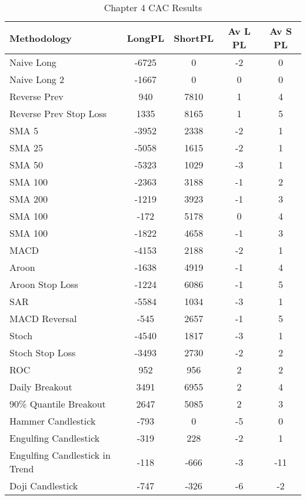 \begin{table}[ht]
\centering
\caption[Chapter 4 CAC Results]{Chapter 4 CAC Results} 
\label{tab:chp6:cac_summary}
\begin{tabular}{lcccc}
  \toprule Methodology & LongPL & ShortPL & Av L PL & Av S PL \\ 
  \midrule Naive Long & -6725 & 0 & -2 & 0 \\ 
  Naive Long 2 & -1667 & 0 & 0 & 0 \\ 
  Reverse Prev & 940 & 7810 & 1 & 4 \\ 
  Reverse Prev Stop Loss & 1335 & 8165 & 1 & 5 \\ 
  SMA 5 & -3952 & 2338 & -2 & 1 \\ 
  SMA 25 & -5058 & 1615 & -2 & 1 \\ 
  SMA 50 & -5323 & 1029 & -3 & 1 \\ 
  SMA 100 & -2363 & 3188 & -1 & 2 \\ 
  SMA 200 & -1219 & 3923 & -1 & 3 \\ 
  SMA 100 & -172 & 5178 & 0 & 4 \\ 
  SMA 100 & -1822 & 4658 & -1 & 3 \\ 
  MACD & -4153 & 2188 & -2 & 1 \\ 
  Aroon & -1638 & 4919 & -1 & 4 \\ 
  Aroon Stop Loss & -1224 & 6086 & -1 & 5 \\ 
  SAR & -5584 & 1034 & -3 & 1 \\ 
  MACD Reversal & -545 & 2657 & -1 & 5 \\ 
  Stoch & -4540 & 1817 & -3 & 1 \\ 
  Stoch Stop Loss & -3493 & 2730 & -2 & 2 \\ 
  ROC & 952 & 956 & 2 & 2 \\ 
  Daily Breakout & 3491 & 6955 & 2 & 4 \\ 
  90\% Quantile Breakout & 2647 & 5085 & 2 & 3 \\ 
  Hammer Candlestick & -793 & 0 & -5 & 0 \\ 
  Engulfing Candlestick & -319 & 228 & -2 & 1 \\ 
  Engulfing Candlestick in Trend & -118 & -666 & -3 & -11 \\ 
  Doji Candlestick & -747 & -326 & -6 & -2 \\ 
   \bottomrule \end{tabular}
\end{table}
